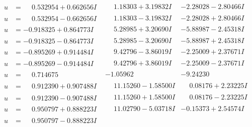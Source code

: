 \documentclass[1p]{elsarticle_modified}
\theoremstyle{definition}
\begin{document}
$$\begin{array}{c|c|c}
\begin{aligned}
u &= \phantom{-}0.532954 + 0.662656 I\end{aligned}
 & \phantom{-}1.18303 + 3.19832 I & -2.28028 - 2.80466 I \\ \hline\begin{aligned}
u &= \phantom{-}0.532954 - 0.662656 I\end{aligned}
 & \phantom{-}1.18303 - 3.19832 I & -2.28028 + 2.80466 I \\ \hline\begin{aligned}
u &= -0.918325 + 0.864773 I\end{aligned}
 & \phantom{-}5.28985 + 3.20690 I & -5.88987 - 2.45318 I \\ \hline\begin{aligned}
u &= -0.918325 - 0.864773 I\end{aligned}
 & \phantom{-}5.28985 - 3.20690 I & -5.88987 + 2.45318 I \\ \hline\begin{aligned}
u &= -0.895269 + 0.914484 I\end{aligned}
 & \phantom{-}9.42796 - 3.86019 I & -2.25009 + 2.37671 I \\ \hline\begin{aligned}
u &= -0.895269 - 0.914484 I\end{aligned}
 & \phantom{-}9.42796 + 3.86019 I & -2.25009 - 2.37671 I \\ \hline\begin{aligned}
u &= \phantom{-}0.714675\phantom{ +0.000000I}\end{aligned}
 & -1.05962\phantom{ +0.000000I} & -9.24230\phantom{ +0.000000I} \\ \hline\begin{aligned}
u &= \phantom{-}0.912390 + 0.907488 I\end{aligned}
 & \phantom{-}11.15260 - 1.58500 I & \phantom{-}0.08176 + 2.23225 I \\ \hline\begin{aligned}
u &= \phantom{-}0.912390 - 0.907488 I\end{aligned}
 & \phantom{-}11.15260 + 1.58500 I & \phantom{-}0.08176 - 2.23225 I \\ \hline\begin{aligned}
u &= \phantom{-}0.950797 + 0.888223 I\end{aligned}
 & \phantom{-}11.02790 - 5.03718 I & -0.15373 + 2.54574 I \\ \hline\begin{aligned}
u &= \phantom{-}0.950797 - 0.888223 I\end{aligned}

\end{array}$$
\end{document}
